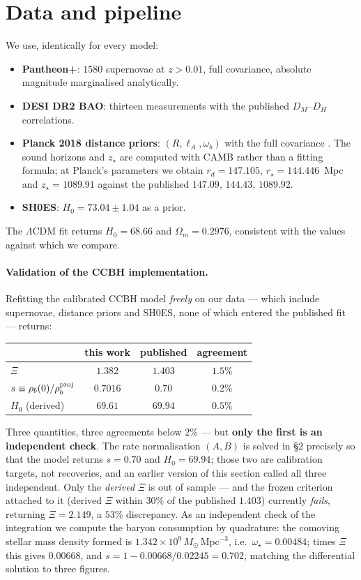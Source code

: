 \documentclass[11pt,a4paper]{article}
\begin{document}
\section{Data and pipeline}

We use, identically for every model:
\begin{itemize}\itemsep2pt
\item \textbf{Pantheon+}: $1580$ supernovae at $z > 0.01$, full covariance, absolute magnitude
marginalised analytically.
\item \textbf{DESI DR2 BAO}: thirteen measurements with the published $D_M$--$D_H$ correlations.
\item \textbf{Planck 2018 distance priors}: $(R, \ell_A, \omega_b)$ with the full covariance
\citep{ChenHuangWang2019}. The sound horizons and $z_\star$ are computed with
CAMB rather than a fitting formula; at Planck's parameters we obtain
$r_d = 147.105$, $r_\star = 144.446$~Mpc and $z_\star = 1089.91$ against the published $147.09$,
$144.43$, $1089.92$.
\item \textbf{SH0ES}: $H_0 = 73.04 \pm 1.04$ as a prior.
\end{itemize}
The $\Lambda$CDM fit returns $H_0 = 68.66$ and $\Omega_{m} = 0.2976$, consistent with the values
against which we compare.

\paragraph{Validation of the CCBH implementation.} Refitting the calibrated CCBH model
\emph{freely} on our data --- which include supernovae, distance priors and SH0ES, none of which
entered the published fit --- returns:
\begin{center}
\begin{tabular}{lccc}
\toprule
 & this work & published \citep{Croker2024} & agreement \\
\midrule
$\Xi$ & $1.382$ & $1.403$ & $1.5\%$ \\
$s \equiv \rho_b(0)/\rho_b^{\rm proj}$ & $0.7016$ & $0.70$ & $0.2\%$ \\
$H_0$ (derived) & $69.61$ & $69.94$ & $0.5\%$ \\
\bottomrule
\end{tabular}
\end{center}
Three quantities, three agreements below $2\%$ --- but \textbf{only the first is an independent check}. The rate normalisation $(A,B)$ is solved in \S2 precisely so that the model returns $s = 0.70$ and $H_0 = 69.94$; those two are calibration targets, not recoveries, and an earlier version of this section called all three independent. Only the \emph{derived} $\Xi$ is out of sample --- and the frozen criterion attached to it (derived $\Xi$ within $30\%$ of the published $1.403$) currently \emph{fails}, returning $\Xi = 2.149$, a $53\%$ discrepancy. As an independent check of the
integration we compute the baryon consumption by quadrature: the comoving stellar mass density
formed is $1.342\times10^{9}\,M_\odot\,\mathrm{Mpc}^{-3}$, i.e.\ $\omega_\star = 0.00484$; times
$\Xi$ this gives $0.00668$, and $s = 1 - 0.00668/0.02245 = 0.702$, matching the differential
solution to three figures.
\end{document}
